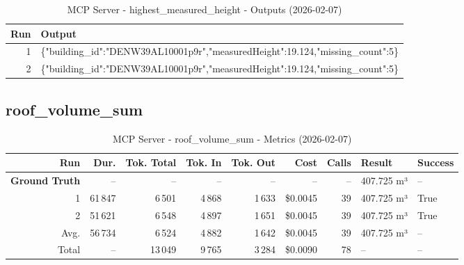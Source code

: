 \documentclass[a4paper,11pt]{article}
\begin{document}
\clearpage

\begin{table}[ht]
\centering
\scriptsize
\caption{MCP Server - highest\_measured\_height - Outputs (2026-02-07)}
\label{tab:mcp\_highest\_measured\_height\_outputs\_2026-02-07}
\begin{tabular}{r p{12cm}}
\hline
Run & Output \\
\hline
1 & \{"building\_id":"DENW39AL10001p9r","measuredHeight":19.124,"missing\_count":5\} \\
2 & \{"building\_id":"DENW39AL10001p9r","measuredHeight":19.124,"missing\_count":5\} \\
\hline
\end{tabular}
\end{table}

\clearpage
\subsection{roof\_volume\_sum}

\begin{table}[ht]
\centering
\scriptsize
\caption{MCP Server - roof\_volume\_sum - Metrics (2026-02-07)}
\label{tab:mcp\_roof\_volume\_sum\_metrics\_2026-02-07}
\begin{tabular}{r r r r r r r p{3cm} l}
\hline
Run & Dur. & Tok. Total & Tok. In & Tok. Out & Cost & Calls & Result & Success \\
\hline
\textbf{Ground Truth} & -- & -- & -- & -- & -- & -- & 407.725 m³ & -- \\
\hline
1 & 61\,847 & 6\,501 & 4\,868 & 1\,633 & \$0.0045 & 39 & 407.725 m³ & True \\
2 & 51\,621 & 6\,548 & 4\,897 & 1\,651 & \$0.0045 & 39 & 407.725 m³ & True \\
\hline
Avg. & 56\,734 & 6\,524 & 4\,882 & 1\,642 & \$0.0045 & 39 & 407.725 m³ & -- \\
Total & -- & 13\,049 & 9\,765 & 3\,284 & \$0.0090 & 78 & -- & -- \\
\hline
\end{tabular}
\end{table}

\clearpage
\end{document}
